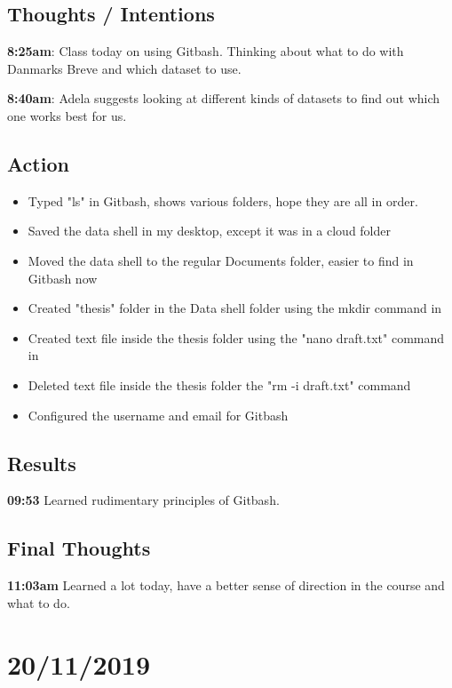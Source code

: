 \documentclass{article}
\begin{document}
\subsection{Thoughts / Intentions}

\textbf{8:25am}: Class today on using Gitbash. Thinking about what to do with Danmarks Breve and which dataset to use.

\textbf{8:40am}: Adela suggests looking at different kinds of datasets to find out which one works best for us.

\subsection{Action}

\begin{itemize}
    \item Typed "ls" in Gitbash, shows various folders, hope they are all in order.
    \item Saved the data shell in my desktop, except it was in a cloud folder
    \item Moved the data shell to the regular Documents folder, easier to find in Gitbash now
    \item Created "thesis" folder in the Data shell folder using the mkdir command in
    \item Created text file inside the thesis folder using the "nano draft.txt" command in
    \item Deleted text file inside the thesis folder the "rm -i draft.txt" command
    \item Configured the username and email for Gitbash
\end{itemize}

\subsection{Results}

\textbf{09:53} Learned rudimentary principles of Gitbash.

\subsection{Final Thoughts}

\textbf{11:03am} Learned a lot today, have a better sense of direction in the course and what to do.

\section{20/11/2019}
\end{document}
